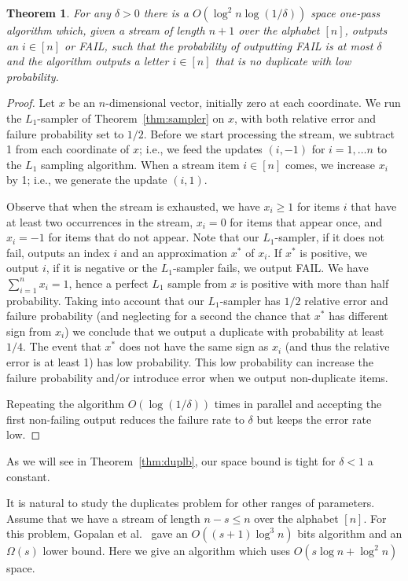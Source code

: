 \documentclass[9pt,letterpaper]{article}
\newtheorem{theorem}{Theorem}
\theoremstyle{remark}
\begin{document}
\begin{theorem}\label{thm:dupub}
For any $\delta>0$ there is a $O(\log^2 n\log(1/\delta))$ space one-pass
algorithm which, given a stream of length $n+1$ over the alphabet $[n]$,
outputs an $i\in[n]$ or FAIL, such that the probability of outputting FAIL
is at most $\delta$ and the algorithm outputs a letter $i\in[n]$ that is no
duplicate with low probability.
\end{theorem}
\begin{proof}
Let $x$ be an $n$-dimensional vector, initially zero at each coordinate. We
run the $L_1$-sampler of Theorem~\ref{thm:sampler} on $x$, with both relative error
and failure probability set to $1/2$. Before we start processing the
stream, we subtract 1 from each coordinate of $x$; i.e., we feed the updates
$(i,-1)$ for $i=1,\ldots n$ to the $L_1$ sampling algorithm. When a stream
item $i\in [n]$ comes, we increase $x_i$ by 1; i.e., we generate the update
$(i,1)$.

Observe that when the stream is exhausted, we have $x_i\geq 1$ for items $i$
that have at least two occurrences in the stream, $x_i=0$ for items that
appear once, and $x_i=-1$ for items that do not appear.  Note that our
$L_1$-sampler, if it does not fail, outputs an index $i$ and an approximation
$x^*$ of $x_i$. If $x^*$ is positive, we output $i$, if it is
negative or the $L_1$-sampler fails, we output FAIL. We have
$\sum_{i=1}^nx_i=1$,  hence a perfect $L_1$ sample from $x$ is positive with
more than half probability. Taking into account that our $L_1$-sampler has
$1/2$ relative error and failure probability (and neglecting for a second the
chance that $x^*$ has different sign from $x_i$) we conclude that we output a
duplicate with probability at least $1/4$. The event that $x^*$ does not have
the same sign as $x_i$ (and thus the relative error is at least 1) has low
probability. This low probability can increase the failure probability and/or
introduce error when we output non-duplicate items.

Repeating the algorithm $O(\log(1/\delta))$ times in parallel and accepting
the first non-failing output reduces the failure rate to
$\delta$ but keeps the error rate low.
\end{proof}

As we will see in Theorem~\ref{thm:duplb}, our space bound is tight for
$\delta<1$ a constant. 

It is natural to study the duplicates problem for other ranges of
parameters. Assume that we have a stream of length $n-s\le n$ over the
alphabet $[n]$. For this problem, Gopalan et al.\ \cite{GopalanJaikumar} gave
an $O((s+1)\log^3 n)$ bits algorithm and an $\Omega(s)$ lower bound. Here we
give an algorithm which uses $O(s\log n+\log^2 n)$ space.
\end{document}
